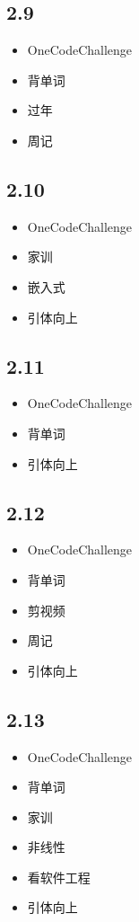 \documentclass[UTF8]{ctexart}
\begin{document}
\subsection*{2.9}
\begin{itemize}
    \item OneCodeChallenge
    \item 背单词
    \item 过年
    \item 周记
\end{itemize}

\subsection*{2.10}
\begin{itemize}
    \item OneCodeChallenge
    \item 家训
    \item 嵌入式
    \item 引体向上
\end{itemize}

\subsection*{2.11}
\begin{itemize}
    \item OneCodeChallenge
    \item 背单词
    \item 引体向上
\end{itemize}

\subsection*{2.12}
\begin{itemize}
    \item OneCodeChallenge
    \item 背单词
    \item 剪视频
    \item 周记
    \item 引体向上
\end{itemize}

\subsection*{2.13}
\begin{itemize}
    \item OneCodeChallenge
    \item 背单词
    \item 家训
    \item 非线性
    \item 看软件工程
    \item 引体向上
\end{itemize}
\end{document}
